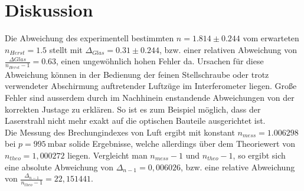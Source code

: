 \section{Diskussion}
Die Abweichung des experimentell bestimmten $n =1.814 \pm 0.244$ vom erwarteten $n_{Herst} = 1.5$ stellt mit $\Delta_{Glas} = 0.31 \pm 0.244$, bzw. einer relativen Abweichung von $\frac{\Delta{Glas}}{n_{Herst}-1} = 0.63$, einen ungewöhnlich hohen Fehler da. Ursachen für diese Abweichung können in der Bedienung der feinen Stellschraube oder trotz verwendeter Abschirmung auftretender Luftzüge im Interferometer liegen.
Große Fehler sind ausserdem durch im Nachhinein enstandende Abweichungen von der korrekten Justage zu erklären. So ist es zum Beispiel möglich, dass der Laserstrahl nicht mehr exakt auf die optischen Bauteile ausgerichtet ist.\\
Die Messung des Brechungindexes von Luft ergibt mit konstant $n_{mess}=1.006298$ bei $p=\SI{995}{\milli\bar}$ solide Ergebnisse, welche allerdings über dem Theoriewert von $n_{theo}=1,000272$ \cite{Luftdruck} liegen. Vergleicht man $n_{mess}-1$ und $n_{theo}-1$, so ergibt sich eine absolute Abweichung von $\Delta_{n-1} = 0,006026$, bzw. eine relative Abweichung von $\frac{\Delta_{n-1}}{n_{theo}-1}=22,151441$.
